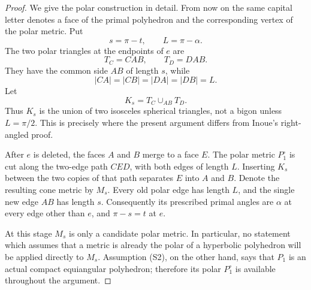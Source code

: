 \documentclass[12pt,a4paper]{article}
\theoremstyle{definition}
\begin{document}
\begin{proof}
We give the polar construction in detail.  From now on the same capital letter
denotes a face of the primal polyhedron and the corresponding vertex of the
polar metric.  Put
\[
        s=\pi-t,\qquad L=\pi-\alpha .
\]
The two polar triangles at the endpoints of \(e\) are
\[
        T_C=CAB,\qquad T_D=DAB.
\]
They have the common side \(AB\) of length \(s\), while
\[
        |CA|=|CB|=|DA|=|DB|=L.
\]
Let
\[
        K_s=T_C\cup_{AB}T_D .
\]
Thus \(K_s\) is the union of two isosceles spherical triangles, not a bigon
unless \(L=\pi/2\).  This is precisely where the present argument differs from
Inoue's right-angled proof.

After \(e\) is deleted, the faces \(A\) and \(B\) merge to a face \(E\).
The polar metric \(P_1^\circ\) is cut along the two-edge path \(CED\), with
both edges of length \(L\).  Inserting \(K_s\) between the two copies of that
path separates \(E\) into \(A\) and \(B\).  Denote the resulting cone metric
by \(M_s\).  Every old polar edge has length \(L\), and the single new edge
\(AB\) has length \(s\).  Consequently its prescribed primal angles are
\(\alpha\) at every edge other than \(e\), and \(\pi-s=t\) at \(e\).

At this stage \(M_s\) is only a candidate polar metric.  In particular, no
statement which assumes that a metric is already the polar of a hyperbolic
polyhedron will be applied directly to \(M_s\).  Assumption \textup{(S2)}, on
the other hand, says that \(P_1\) is an actual compact equiangular polyhedron;
therefore its polar \(P_1^\circ\) is available throughout the argument.


\end{proof}
\end{document}
